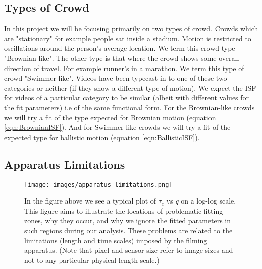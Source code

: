 \documentclass[10pt]{article}
\begin{document}
\subsection{Types of Crowd}
\label{section:crowdtypes}
In this project we will be focusing primarily on two types of crowd. Crowds which are "stationary" for example people sat inside a stadium. Motion is restricted to oscillations around the person's average location. We term this crowd type "Brownian-like". The other type is that where the crowd shows some overall direction of travel. For example runner's in a marathon. We term this type of crowd "Swimmer-like". Videos have been typecast in to one of these two categories or neither (if they show a different type of motion). We expect the ISF for videos of a particular category to be similar (albeit with different values for the fit parameters) i.e of the same functional form. For the Brownian-like crowds we will try a fit of the type expected for Brownian motion (equation \ref{eqn:BrownianISF}). And for Swimmer-like crowds we will try a fit of the expected type for ballistic motion (equation \ref{eqn:BallisticISF}).

\subsection{Apparatus Limitations}
\label{section:fitting_issues}
\begin{figure}[H]
\centering
\centerline{\texttt{[image: images/apparatus\_limitations.png]}}
\caption{
In the figure above we see a typical plot of $\tau_c$ vs  \textit{q} on a log-log scale. This figure aims to illustrate the locations of problematic fitting zones, why they occur, and why we ignore the fitted parameters in such regions during our analysis. These problems are related to the limitations (length and time scales) imposed by the filming apparatus. (Note that pixel and sensor size refer to image sizes and not to any particular physical length-scale.)
}
\end{figure}
\end{document}
